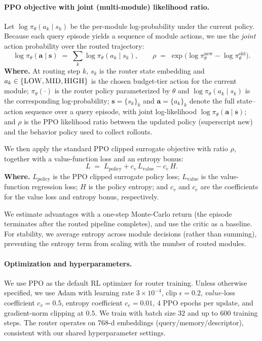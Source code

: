 \paragraph{PPO objective with joint (multi-module) likelihood ratio.}
Let $\log \pi_\theta(a_k\mid s_k)$ be the per-module log-probability under the current policy.
Because each query episode yields a sequence of module actions, we use the \emph{joint} action probability over the routed trajectory:
\begin{equation}
\log \pi_\theta(\mathbf{a}\mid \mathbf{s})
\;=\;
\sum_k \log \pi_\theta(a_k\mid s_k),
\qquad
\rho
\;=\;
\exp\!\Big(\log \pi_\theta^{\text{new}} - \log \pi_\theta^{\text{old}}\Big).
\label{eq:ppo_joint_ratio}
\end{equation}
\noindent\textbf{Where.} At routing step $k$, $s_k$ is the router state embedding and $a_k\in\{\textsc{LOW},\textsc{MID},\textsc{HIGH}\}$ is the chosen budget-tier action for the current module; $\pi_\theta(\cdot)$ is the router policy parameterized by $\theta$ and $\log \pi_\theta(a_k\mid s_k)$ is the corresponding log-probability; $\mathbf{s}=\{s_k\}_k$ and $\mathbf{a}=\{a_k\}_k$ denote the full state--action sequence over a query episode, with joint log-likelihood $\log \pi_\theta(\mathbf{a}\mid\mathbf{s})$; and $\rho$ is the PPO likelihood ratio between the updated policy (superscript $\text{new}$) and the behavior policy used to collect rollouts.

We then apply the standard PPO clipped surrogate objective with ratio $\rho$, together with a value-function loss and an entropy bonus:
\begin{equation}
L \;=\; L_{\text{policy}} + c_v\, L_{\text{value}} - c_e\, H.
\label{eq:ppo_loss}
\end{equation}
\noindent\textbf{Where.} $L_{\text{policy}}$ is the PPO clipped surrogate policy loss; $L_{\text{value}}$ is the value-function regression loss; $H$ is the policy entropy; and $c_v$ and $c_e$ are the coefficients for the value loss and entropy bonus, respectively.

We estimate advantages with a one-step Monte-Carlo return (the episode terminates after the routed pipeline completes), and use the critic as a baseline.
For stability, we average entropy across module decisions (rather than summing), preventing the entropy term from scaling with the number of routed modules.

\paragraph{Optimization and hyperparameters.}
We use PPO as the default RL optimizer for router training.
Unless otherwise specified, we use Adam with learning rate $3\times 10^{-4}$, clip $\epsilon=0.2$,
$value$-loss coefficient $c_v=0.5$, entropy coefficient $c_e=0.01$,
$4$ PPO epochs per update, and gradient-norm clipping at $0.5$.
We train with batch size $32$ and up to $600$ training steps.
The router operates on 768-d embeddings (query/memory/descriptor), consistent with our shared hyperparameter settings.




